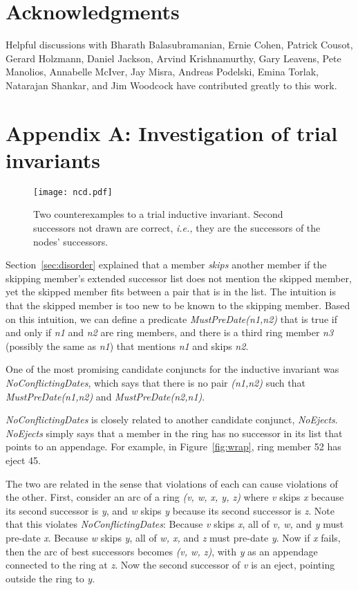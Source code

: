 \documentclass[conference]{IEEEtran}
\begin{document}
\section*{Acknowledgments}

Helpful discussions with
Bharath Balasubramanian,
Ernie Cohen,
Patrick Cousot,
Gerard Holzmann,
Daniel Jackson,
Arvind Krishnamurthy,
Gary Leavens,
Pete Manolios,
Annabelle McIver,
Jay Misra,
Andreas Podelski,
Emina Torlak,
Natarajan Shankar, and
Jim Woodcock
have contributed greatly to this work.




\section*{Appendix A: Investigation of trial invariants}

\begin{figure*}
\centering
\texttt{[image: ncd.pdf]}
\caption{Two counterexamples to a trial inductive invariant.
Second successors not drawn are correct, {\it i.e.,} they are the
successors of the nodes' successors.}
\label{fig:ncd}
\end{figure*}

Section~\ref{sec:disorder} explained that a member {\it skips} another
member if the skipping member's extended successor list does not
mention the skipped member, yet the skipped member fits between a pair
that is in the list.
The intuition is that the skipped member is too new to be known to
the skipping member.
Based on this intuition, we can define a predicate {\it MustPreDate(n1,n2)}
that is true if and only if {\it n1} and {\it n2} are ring members,
and there is a third ring member {\it n3} (possibly the same as {\it n1})
that mentions {\it n1} and skips {\it n2}.

One of the most promising candidate conjuncts for the inductive
invariant was {\it NoConflictingDates}, which says that there is no
pair {\it (n1,n2)} such that {\it MustPreDate(n1,n2)} and
{\it MustPreDate(n2,n1)}.

{\it NoConflictingDates} is closely related to another candidate
conjunct, {\it NoEjects}.
{\it NoEjects} simply says that a member in the ring has no
successor in its list that points to an appendage.
For example, in Figure~\ref{fig:wrap}, ring member 52 has eject 45.

The two are related in the sense that violations of each can cause
violations of the other.
First, consider an arc of a ring {\it (v, w, x, y, z)}
where {\it v} skips {\it x} because its second successor is {\it y},
and {\it w} skips {\it y} because its second successor is {\it z}.
Note that this violates {\it NoConflictingDates}:
Because 
{\it v} skips {\it x}, all of {\it v, w,} and {\it y} must pre-date
{\it x}.
Because 
{\it w} skips {\it y}, all of {\it w, x,} and {\it z} must pre-date
{\it y}.
Now if {\it x} fails, then the arc of best successors becomes
{\it (v, w, z)}, with {\it y} as an appendage connected to the ring
at {\it z}.
Now the second successor of {\it v} is an eject, pointing outside
the ring to {\it y}.
\end{document}
